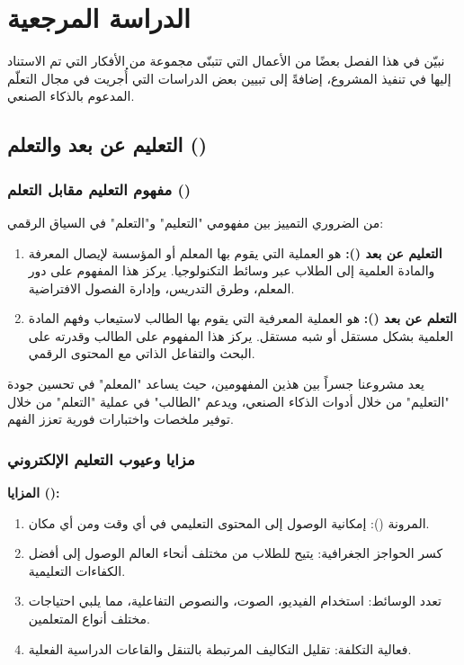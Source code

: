\chapter{الدراسة المرجعية}

\begin{chaptersummary}
نبيّن في هذا الفصل بعضًا من الأعمال التي تتبنّى مجموعة من الأفكار التي تم الاستناد إليها في تنفيذ المشروع، إضافةً إلى تبيين بعض الدراسات التي أُجريت في مجال التعلّم المدعوم بالذكاء الصنعي.
\end{chaptersummary}

\section{التعليم عن بعد والتعلم ()}

\subsection{مفهوم التعليم مقابل التعلم ()}

من الضروري التمييز بين مفهومي "التعليم" و"التعلم" في السياق الرقمي:

\begin{enumerate}
  \item \textbf{التعليم عن بعد ():} هو العملية التي يقوم بها المعلم أو المؤسسة لإيصال المعرفة والمادة العلمية إلى الطلاب عبر وسائط التكنولوجيا. يركز هذا المفهوم على دور المعلم، وطرق التدريس، وإدارة الفصول الافتراضية.
  \item \textbf{التعلم عن بعد ():} هو العملية المعرفية التي يقوم بها الطالب لاستيعاب وفهم المادة العلمية بشكل مستقل أو شبه مستقل. يركز هذا المفهوم على الطالب وقدرته على البحث والتفاعل الذاتي مع المحتوى الرقمي.
\end{enumerate}

يعد مشروعنا جسراً بين هذين المفهومين، حيث يساعد "المعلم" في تحسين جودة "التعليم" من خلال أدوات الذكاء الصنعي، ويدعم "الطالب" في عملية "التعلم" من خلال توفير ملخصات واختبارات فورية تعزز الفهم.

\subsection{مزايا وعيوب التعليم الإلكتروني}

\textbf{المزايا ():}

\begin{enumerate}
  \item المرونة (): إمكانية الوصول إلى المحتوى التعليمي في أي وقت ومن أي مكان.
  \item كسر الحواجز الجغرافية: يتيح للطلاب من مختلف أنحاء العالم الوصول إلى أفضل الكفاءات التعليمية.
  \item تعدد الوسائط: استخدام الفيديو، الصوت، والنصوص التفاعلية، مما يلبي احتياجات مختلف أنواع المتعلمين.
  \item فعالية التكلفة: تقليل التكاليف المرتبطة بالتنقل والقاعات الدراسية الفعلية.
\end{enumerate}

